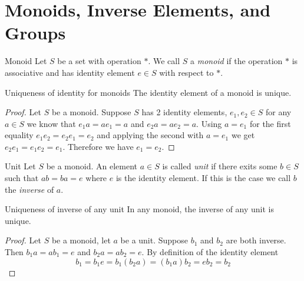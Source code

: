 \documentclass[16pt,a4paper]{article}
\theoremstyle{definition}
\begin{document}
\section{Monoids, Inverse Elements, and Groups}

\begin{defn}{Monoid}{}
Let $S$ be a set with operation $*$. We call $S$ a \textit{monoid} if the operation $*$ is associative and has identity element $e\in S$ with respect to $*$.   
\end{defn}

\begin{thm}{Uniqueness of identity for monoids}{}
The identity element of a monoid is unique. 
\end{thm}
\begin{proof}
Let $S$ be a monoid. Suppose $S$ has 2 identity elements, $e_1, e_2 \in S$ for any $a\in S$ we know that $e_1a = ae_1 = a$ and $e_2a= ae_2 = a$. Using $a=e_1$ for the first equality $e_1e_2 = e_2e_1 = e_2$ and applying the second with $a=e_1$ we get $e_2e_1= e_1e_2 = e_1$. Therefore we have $e_1 = e_2$. 
\end{proof}


\begin{defn}{Unit}{}
Let $S$ be a monoid. An element $a\in S$ is called \textit{unit} if there exits some $b\in S$ such that $ab=ba=e$ where $e$ is the identity element. If this is the case we call $b$ the \textit{inverse} of $a$. 
\end{defn}

\begin{lemm}{Uniqueness of inverse of any unit}{}\label{uniq-inv}
In any monoid, the inverse of any unit is unique.
\end{lemm}
\begin{proof}
Let $S$ be a monoid, let $a$ be a unit. Suppose $b_1$ and $b_2$ are both inverse. Then $b_1a=ab_1=e$ and $b_2a=ab_2 = e$. By definition of the identity element 
\[b_1 = b_1e = b_1(b_2a)=(b_1a)b_2 = eb_2 = b_2\]
\end{proof}


\newpage
\end{document}
